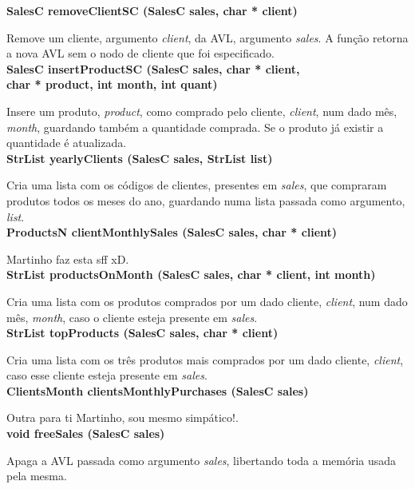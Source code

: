 \documentclass[10pt] {article}
\begin{document}
\noindent \textbf {SalesC removeClientSC (SalesC sales, char * client)}
\par Remove um cliente, argumento \emph{client}, da AVL, argumento \emph{sales}. A função retorna a nova AVL 
sem o nodo de cliente que foi especificado. \\

\noindent \textbf {SalesC insertProductSC (SalesC sales, char * client, \\ char * product, int month, int quant)}
\par Insere um produto, \emph{product}, como comprado pelo cliente, \emph{client}, num dado mês, \emph{month}, 
guardando também a quantidade comprada. Se o produto já existir a quantidade é atualizada. \\

\noindent \textbf {StrList yearlyClients (SalesC sales, StrList list)}
\par Cria uma lista com os códigos de clientes, presentes em \emph{sales}, que compraram produtos todos os 
meses do ano, guardando numa lista passada como argumento, \emph{list}. \\

\noindent \textbf {ProductsN clientMonthlySales (SalesC sales, char * client)}
\par Martinho faz esta sff xD. \\

\noindent \textbf {StrList productsOnMonth (SalesC sales, char * client, int month)}
\par Cria uma lista com os produtos comprados por um dado cliente, \emph{client}, num dado mês, \emph{month}, 
caso o cliente esteja presente em \emph{sales}. \\

\noindent \textbf {StrList topProducts (SalesC sales, char * client)}
\par Cria uma lista com os três produtos mais comprados por um dado cliente, \emph{client}, caso esse cliente 
esteja presente em \emph{sales}. \\

\noindent \textbf {ClientsMonth clientsMonthlyPurchases (SalesC sales)}
\par Outra para ti Martinho, sou mesmo simpático!. \\

\noindent \textbf {void freeSales (SalesC sales)}
\par Apaga a AVL passada como argumento \emph{sales}, libertando toda a memória usada pela mesma. \\
\end{document}
